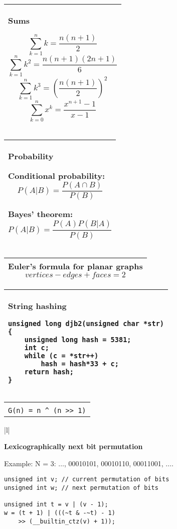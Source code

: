 \documentclass[10pt,a4paper,twocolumn]{article}
\newenvironment{fpar}
	{
		\nopagebreak
		\begin{tabular}{|l|}
		\hline\begin{minipage}{277pt}
		\vspace{0.5em}
	}
	{
		\vspace{0.5em}
		\end{minipage}\\
		\hline\end{tabular}
		\nopagebreak
	}
\begin{document}
\begin{fpar}
{\bf Sums}

$$\sum_{k=1}^n k = \frac{n (n+1)}2$$
$$\sum_{k=1}^n k^2 = \frac{n (n+1) (2n+1)}6$$
$$\sum_{k=1}^n k^3 = \left(\frac{n (n+1)}2\right)^2$$
$$\sum_{k=0}^n x^k = \frac{x^{n+1} - 1}{x - 1}$$
\end{fpar}

\begin{fpar}
{\bf Probability}

Conditional probability:
$$P(A|B) = \frac{P(A \cap B)}{P(B)}$$

Bayes' theorem:
$$P(A|B) = \frac{P(A) P(B|A)}{P(B)}$$
\end{fpar}

\begin{fpar}
{\bf Euler's formula for planar graphs}
$$vertices - edges + faces = 2$$
\end{fpar}

\begin{fpar}
{\bf String hashing}

\begin{lstlisting}
unsigned long djb2(unsigned char *str)
{
	unsigned long hash = 5381;
	int c;
	while (c = *str++)
		hash = hash*33 + c;
	return hash;
}
\end{lstlisting}
\end{fpar}

\begin{fpar}
{\bf Gray code}

Gray code is a binary numeral system where two successive values differ in only
one bit.\\
\verb+G(n) = n ^ (n >> 1)+
\end{fpar}

\begin{fpar}
{\bf Lexicographically next bit permutation}

Example: N = 3: $\ldots$, 00010101, 00010110, 00011001, $\ldots$.

\begin{lstlisting}
unsigned int v; // current permutation of bits 
unsigned int w; // next permutation of bits

unsigned int t = v | (v - 1);
w = (t + 1) | (((~t & -~t) - 1)
	>> (__builtin_ctz(v) + 1));  
\end{lstlisting}
\end{fpar}
\end{document}
